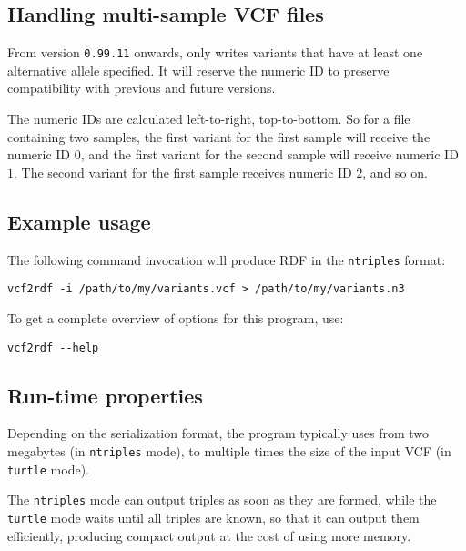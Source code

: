 \subsection{Handling multi-sample VCF files}

  From version \texttt{0.99.11} onwards,  only writes variants
  that have at least one alternative allele specified.  It will reserve the
  numeric ID to preserve compatibility with previous and future versions.

  The numeric IDs are calculated left-to-right, top-to-bottom.  So for a file
  containing two samples, the first variant for the first sample will receive
  the numeric ID $0$, and the first variant for the second sample will receive
  numeric ID $1$.  The second variant for the first sample receives numeric ID
  $2$, and so on.

\subsection{Example usage}

The following command invocation will produce RDF in the \texttt{ntriples}
format:
\begin{siderules}
\begin{verbatim}
vcf2rdf -i /path/to/my/variants.vcf > /path/to/my/variants.n3
\end{verbatim}
\end{siderules}

To get a complete overview of options for this program, use:
\begin{siderules}
\begin{verbatim}
vcf2rdf --help
\end{verbatim}
\end{siderules}

\subsection{Run-time properties}

  Depending on the serialization format, the program typically uses from two megabytes
  (in \texttt{ntriples} mode), to multiple times the size of the input VCF
  (in \texttt{turtle} mode).

  The \texttt{ntriples} mode can output triples as soon as they are formed, while the
  \texttt{turtle} mode waits until all triples are known, so that it can output them
  efficiently, producing compact output at the cost of using more memory.

